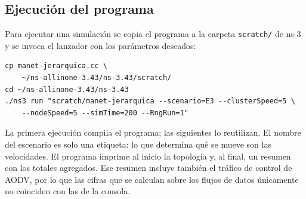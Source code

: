 \subsection{Ejecución del programa}

Para ejecutar una simulación se copia el programa a la carpeta \texttt{scratch/} de ns-3
y se invoca el lanzador con los parámetros deseados:

\begin{verbatim}
cp manet-jerarquica.cc \
    ~/ns-allinone-3.43/ns-3.43/scratch/
cd ~/ns-allinone-3.43/ns-3.43
./ns3 run "scratch/manet-jerarquica --scenario=E3 --clusterSpeed=5 \
    --nodeSpeed=5 --simTime=200 --RngRun=1"
\end{verbatim}

La primera ejecución compila el programa; las siguientes lo reutilizan. El nombre del
escenario es solo una etiqueta: lo que determina qué se mueve son las velocidades. El
programa imprime al inicio la topología y, al final, un resumen con los totales
agregados. Ese resumen incluye también el tráfico de control de AODV, por lo que las
cifras que se calculan sobre los flujos de datos únicamente no coinciden con las de la
consola.


